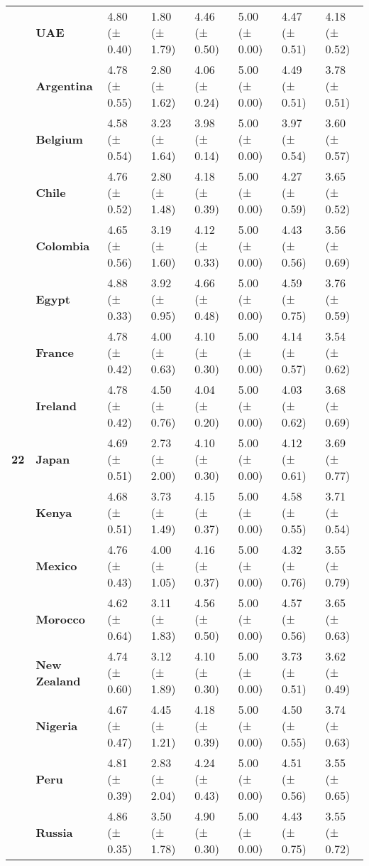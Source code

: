 \begin{tabular}{llllllll}
\textbf{} & \textbf{UAE} & 4.80 (± 0.40) & 1.80 (± 1.79) & 4.46 (± 0.50) & 5.00 (± 0.00) & 4.47 (± 0.51) & 4.18 (± 0.52) \\
\cline{1-8}
\multirow[t]{19}{*}{\textbf{22}} & \textbf{Argentina} & 4.78 (± 0.55) & 2.80 (± 1.62) & 4.06 (± 0.24) & 5.00 (± 0.00) & 4.49 (± 0.51) & 3.78 (± 0.51) \\
\textbf{} & \textbf{Belgium} & 4.58 (± 0.54) & 3.23 (± 1.64) & 3.98 (± 0.14) & 5.00 (± 0.00) & 3.97 (± 0.54) & 3.60 (± 0.57) \\
\textbf{} & \textbf{Chile} & 4.76 (± 0.52) & 2.80 (± 1.48) & 4.18 (± 0.39) & 5.00 (± 0.00) & 4.27 (± 0.59) & 3.65 (± 0.52) \\
\textbf{} & \textbf{Colombia} & 4.65 (± 0.56) & 3.19 (± 1.60) & 4.12 (± 0.33) & 5.00 (± 0.00) & 4.43 (± 0.56) & 3.56 (± 0.69) \\
\textbf{} & \textbf{Egypt} & 4.88 (± 0.33) & 3.92 (± 0.95) & 4.66 (± 0.48) & 5.00 (± 0.00) & 4.59 (± 0.75) & 3.76 (± 0.59) \\
\textbf{} & \textbf{France} & 4.78 (± 0.42) & 4.00 (± 0.63) & 4.10 (± 0.30) & 5.00 (± 0.00) & 4.14 (± 0.57) & 3.54 (± 0.62) \\
\textbf{} & \textbf{Ireland} & 4.78 (± 0.42) & 4.50 (± 0.76) & 4.04 (± 0.20) & 5.00 (± 0.00) & 4.03 (± 0.62) & 3.68 (± 0.69) \\
\textbf{} & \textbf{Japan} & 4.69 (± 0.51) & 2.73 (± 2.00) & 4.10 (± 0.30) & 5.00 (± 0.00) & 4.12 (± 0.61) & 3.69 (± 0.77) \\
\textbf{} & \textbf{Kenya} & 4.68 (± 0.51) & 3.73 (± 1.49) & 4.15 (± 0.37) & 5.00 (± 0.00) & 4.58 (± 0.55) & 3.71 (± 0.54) \\
\textbf{} & \textbf{Mexico} & 4.76 (± 0.43) & 4.00 (± 1.05) & 4.16 (± 0.37) & 5.00 (± 0.00) & 4.32 (± 0.76) & 3.55 (± 0.79) \\
\textbf{} & \textbf{Morocco} & 4.62 (± 0.64) & 3.11 (± 1.83) & 4.56 (± 0.50) & 5.00 (± 0.00) & 4.57 (± 0.56) & 3.65 (± 0.63) \\
\textbf{} & \textbf{New Zealand} & 4.74 (± 0.60) & 3.12 (± 1.89) & 4.10 (± 0.30) & 5.00 (± 0.00) & 3.73 (± 0.51) & 3.62 (± 0.49) \\
\textbf{} & \textbf{Nigeria} & 4.67 (± 0.47) & 4.45 (± 1.21) & 4.18 (± 0.39) & 5.00 (± 0.00) & 4.50 (± 0.55) & 3.74 (± 0.63) \\
\textbf{} & \textbf{Peru} & 4.81 (± 0.39) & 2.83 (± 2.04) & 4.24 (± 0.43) & 5.00 (± 0.00) & 4.51 (± 0.56) & 3.55 (± 0.65) \\
\textbf{} & \textbf{Russia} & 4.86 (± 0.35) & 3.50 (± 1.78) & 4.90 (± 0.30) & 5.00 (± 0.00) & 4.43 (± 0.75) & 3.55 (± 0.72) \\

\end{tabular}
